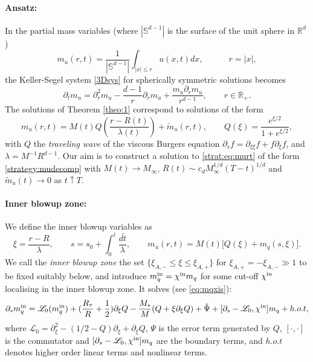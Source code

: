 \documentclass[11pt]{aims}
\theoremstyle{definition}
\newcommand{\Rb}{\mathbb{R}}
\newcommand{\Ls}{\mathscr{L}}
\newcommand{\pa}{\partial}
\newcommand{\inn}{\textup{in}}
\newcommand{\be}{\begin{equation}}
\newcommand{\ee}{\end{equation}}
\numberwithin{equation}{section}
\begin{document}
\paragraph{Ansatz:} In the partial mass variables (where $|\mathbb{S}^{d-1}|$ is the surface of the unit sphere in $\Rb^d$)
\begin{equation}\label{strat:def:murt}
m_u(r,t) = \frac{1}{|\mathbb{S}^{d-1}|}\int_{|x|\leq r} u(x, t)dx,  \qquad \quad r=|x|,
\end{equation}
the Keller-Segel system \eqref{3Dsys} for spherically symmetric solutions becomes
\begin{equation}\label{strat:eq:murt}
\pa_t m_u = \pa_r^2 m_u -\frac{d-1}{r}\pa_r m_u + \frac{m_u \pa_r m_u}{r^{d-1}}, \qquad r \in \Rb_+.
\end{equation}
The solutions of Theorem \ref{theo:1} correspond to solutions of the form
\be \label{strategy:mudecomp}
m_u(r,t)= M(t)Q\left(\frac{r-R(t)}{\lambda(t)} \right)+\tilde m_u(r,t), \qquad Q(\xi)=\frac{e^{\xi/2}}{1+e^{\xi/2}},
\ee
with $Q$ the \emph{traveling wave} of the viscous Burgers equation $\pa_s f=\pa_{\xi \xi }f+f\pa_\xi f$, and $\lambda=M^{-1}R^{d-1}$. Our aim is to construct a solution to \eqref{strat:eq:murt} of the form \eqref{strategy:mudecomp} with $M(t)\to M_\infty$, $R(t)\sim c_d M_\infty^{1/d}(T-t)^{1/d}$ and $\tilde m_u(t)\to 0$ as $t\uparrow T$.

\vspace{0.2cm}

\paragraph{Inner blowup zone:} We define the inner blowup variables as
\begin{equation}\label{strat:def:xis}
 \xi=\frac{r-R}{\lambda}, \qquad s=s_0+\int_0^t \frac{d\tilde t}{\lambda}, \qquad m_u(r,t)=M(t)\big[Q(\xi)+m_q(s,\xi)\big].
\end{equation}
We call the \emph{inner blowup zone} the set $\{\xi_{A,-}\leq \xi \leq \xi_{A,+}\}$ for $\xi_{A,+}=-\xi_{A,-}\gg 1$ to be fixed suitably below, and introduce $m_q^\inn=\chi^\inn m_q$ for some cut-off $\chi^\inn $ localising in the inner blowup zone. It solves (see \eqref{eq:mqxis}):
\be \label{strat:eqmq}
\pa_s m_q^\inn=\Ls_0 (m_q^\inn) +(\frac{R_\tau}{R}+\frac{1}{2}) \pa_\xi Q-\frac{M_s}{M}( Q+\xi \pa_\xi Q) +\tilde \Psi + [\pa_s -\Ls_0,\chi^\inn]m_q+ h.o.t,
\ee
where $\Ls_0 = \partial_\xi^2 - \left(1/2- Q\right)\partial_\xi + \pa_\xi Q$, $\Psi$ is the error term generated by $Q$, $[\cdot,\cdot]$ is the commutator and $ [\pa_s -\Ls_0,\chi^\inn]m_q$ are the boundary terms, and $h.o.t$ denotes higher order linear terms and nonlinear terms.
\end{document}
